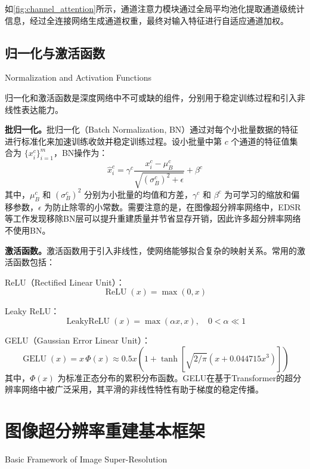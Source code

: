 如\autoref{fig:channel_attention}所示，通道注意力模块通过全局平均池化提取通道级统计信息，经过全连接网络生成通道权重，最终对输入特征进行自适应通道加权。

\subsection{归一化与激活函数}{Normalization and Activation Functions}

归一化和激活函数是深度网络中不可或缺的组件，分别用于稳定训练过程和引入非线性表达能力。

\textbf{批归一化。}批归一化（Batch Normalization, BN）通过对每个小批量数据的特征进行标准化来加速训练收敛并稳定训练过程。设小批量中第 $c$ 个通道的特征值集合为 $\{x_i^c\}_{i=1}^{m}$，BN操作为：
\begin{equation}
  \hat{x}_i^c = \gamma^c\frac{x_i^c - \mu_B^c}{\sqrt{(\sigma_B^c)^2 + \epsilon}} + \beta^c
  \label{eq:batch_norm}
\end{equation}
其中，$\mu_B^c$ 和 $(\sigma_B^c)^2$ 分别为小批量的均值和方差，$\gamma^c$ 和 $\beta^c$ 为可学习的缩放和偏移参数，$\epsilon$ 为防止除零的小常数。需要注意的是，在图像超分辨率网络中，EDSR\cite{lim2017enhanced}等工作发现移除BN层可以提升重建质量并节省显存开销，因此许多超分辨率网络不使用BN。

\textbf{激活函数。}激活函数用于引入非线性，使网络能够拟合复杂的映射关系。常用的激活函数包括：

ReLU（Rectified Linear Unit）：
\begin{equation}
  \operatorname{ReLU}(x) = \max(0, x)
  \label{eq:relu}
\end{equation}

Leaky ReLU：
\begin{equation}
  \operatorname{LeakyReLU}(x) = \max(\alpha x, x), \quad 0 < \alpha \ll 1
  \label{eq:leaky_relu}
\end{equation}

GELU（Gaussian Error Linear Unit）：
\begin{equation}
  \operatorname{GELU}(x) = x\,\Phi(x) \approx 0.5x\left(1+\tanh\left[\sqrt{2/\pi}\left(x+0.044715x^3\right)\right]\right)
  \label{eq:gelu}
\end{equation}
其中，$\Phi(x)$ 为标准正态分布的累积分布函数。GELU在基于Transformer的超分辨率网络中被广泛采用，其平滑的非线性特性有助于梯度的稳定传播。

\section{图像超分辨率重建基本框架}{Basic Framework of Image Super-Resolution}

